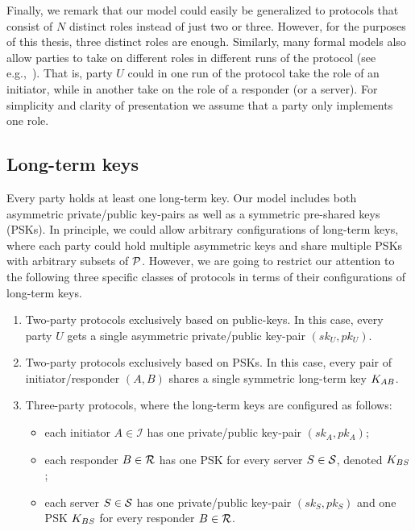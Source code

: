 Finally,
we remark that our model could easily be generalized to protocols that consist of $N$ distinct roles instead of just two or three.
However,
for the purposes of this thesis,
three distinct roles are enough. 
Similarly,
many formal models also allow parties to take on different roles in different runs of the protocol
(see e.g.,~\cite{C:JKSS12}).
That is,
party $U$ could in one run of the protocol take the role of an initiator,
while in another take on the role of a responder (or a server).
For simplicity and clarity of presentation we assume that a party only implements one role.  




\subsection{Long-term keys}\label{sec:definitions:long-term-keys}
Every party holds at least one long-term key.
Our model includes both asymmetric private/public key-pairs as well as a symmetric pre-shared keys (PSKs).
In principle,
we could allow arbitrary configurations of long-term keys,
where each party could hold multiple asymmetric keys and share multiple PSKs with arbitrary subsets of $\mathcal{P}$.
However,
we are going to restrict our attention to the following three specific classes of protocols in terms of their configurations of long-term keys.
\begin{enumerate}
	\item Two-party protocols exclusively based on public-keys.
	In this case,
	every party $U$ gets a single asymmetric private/public key-pair $(sk_U, pk_U)$.
	
	\item Two-party protocols exclusively based on PSKs.
	In this case, every pair of initiator/responder $(A,B)$ shares a single symmetric long-term key $K_{AB}$. 

	\item\label{sec:definitions:long-term-keys:configuration:3P} Three-party protocols, 
	where the long-term keys are configured as follows:
	\begin{itemize}
		\item each initiator $A \in \mathcal{I}$ has one private/public key-pair $(sk_A, pk_A)$;
		
		\item each responder $B \in \mathcal{R}$ has one PSK for every server $S \in \mathcal{S}$,
		denoted $K_{BS}$;
		
		\item each server $S \in \mathcal{S}$ has one private/public key-pair $(sk_S, pk_S)$ and one PSK $K_{BS}$ for every responder $B \in \mathcal{R}$. 
	\end{itemize}  
		
\end{enumerate}


